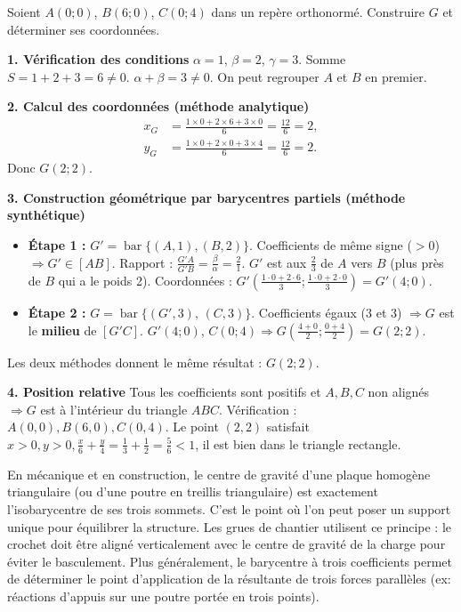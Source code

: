\documentclass[11pt]{article}
\newcounter{popsec}
\newcounter{popsub}
\newcommand{\courssub}[1]{%
  \stepcounter{popsub}%
  \par\vspace{9pt}\noindent{\popxbold\fontsize{11.5}{13}\selectfont\color{popink}{\color{poporange}\thepopsec.\thepopsub}\hspace{6pt}#1}\par\nopagebreak\vspace{4pt}
}
\begin{document}
\courssub{Exemple chiffré complet}

\begin{exoresolu}[Construction et coordonnées de $G = \operatorname{bar}\{(A,1),(B,2),(C,3)\}$]
Soient $A(0;0)$, $B(6;0)$, $C(0;4)$ dans un repère orthonormé. Construire $G$ et déterminer ses coordonnées.

\textbf{1. Vérification des conditions}
$\alpha=1$, $\beta=2$, $\gamma=3$. Somme $S = 1+2+3 = 6 \neq 0$. $\alpha+\beta = 3 \neq 0$. On peut regrouper $A$ et $B$ en premier.

\textbf{2. Calcul des coordonnées (méthode analytique)}
\begin{align*}
x_G &= \frac{1\times 0 + 2\times 6 + 3\times 0}{6} = \frac{12}{6} = 2, \\
y_G &= \frac{1\times 0 + 2\times 0 + 3\times 4}{6} = \frac{12}{6} = 2.
\end{align*}
Donc $G(2;2)$.

\textbf{3. Construction géométrique par barycentres partiels (méthode synthétique)}
\begin{itemize}
\item \textbf{Étape 1 :} $G' = \operatorname{bar}\{(A,1),(B,2)\}$.
      Coefficients de même signe ($>0$) $\Rightarrow G' \in [AB]$.
      Rapport : $\frac{G'A}{G'B} = \frac{\beta}{\alpha} = \frac{2}{1}$. $G'$ est aux $\frac{2}{3}$ de $A$ vers $B$ (plus près de $B$ qui a le poids 2).
      Coordonnées : $G'\left(\frac{1\cdot0+2\cdot6}{3}; \frac{1\cdot0+2\cdot0}{3}\right) = G'(4;0)$.
\item \textbf{Étape 2 :} $G = \operatorname{bar}\{(G',3),\,(C,3)\}$.
      Coefficients égaux ($3$ et $3$) $\Rightarrow G$ est le \textbf{milieu} de $[G'C]$.
      $G'\left(4;0\right)$, $C\left(0;4\right) \Rightarrow G\left(\frac{4+0}{2}; \frac{0+4}{2}\right) = G(2;2)$.
\end{itemize}
Les deux méthodes donnent le même résultat : \textbf{$G(2;2)$}.

\textbf{4. Position relative}
Tous les coefficients sont positifs et $A,B,C$ non alignés $\Rightarrow G$ est à l'intérieur du triangle $ABC$. Vérification : $A(0,0), B(6,0), C(0,4)$. Le point $(2,2)$ satisfait $x>0, y>0, \frac{x}{6}+\frac{y}{4}=\frac{1}{3}+\frac{1}{2}=\frac{5}{6}<1$, il est bien dans le triangle rectangle.
\end{exoresolu}

\begin{savaistu}
En mécanique et en construction, le centre de gravité d'une plaque homogène triangulaire (ou d'une poutre en treillis triangulaire) est exactement l'isobarycentre de ses trois sommets. C'est le point où l'on peut poser un support unique pour équilibrer la structure. Les grues de chantier utilisent ce principe : le crochet doit être aligné verticalement avec le centre de gravité de la charge pour éviter le basculement. Plus généralement, le barycentre à trois coefficients permet de déterminer le point d'application de la résultante de trois forces parallèles (ex: réactions d'appuis sur une poutre portée en trois points).
\end{savaistu}
\end{document}
